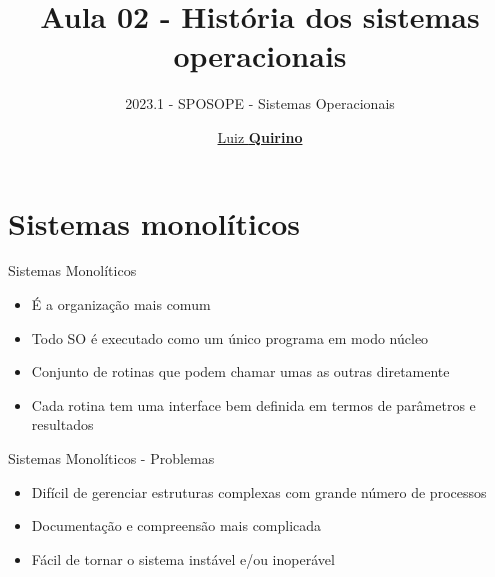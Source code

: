 \documentclass{beamer}
\title{Aula 02 - História dos sistemas operacionais}
\subtitle{2023.1 - SPOSOPE - Sistemas Operacionais}
\author{\href{mailto:luizfpq@gmail.com}{Luiz \textbf{Quirino}}}
\newcommand{\hrefcol}[2]{\textcolor{cyan}{\href{#1}{#2}}}
\begin{document}
\maketitle

%
%




\section{Sistemas monolíticos}

\begin{frame}{Sistemas Monolíticos}
    \begin{itemize}
        \item É a organização mais comum
        \item Todo SO é executado como um único programa em modo núcleo
        \item Conjunto de rotinas que podem chamar umas as outras diretamente
        \item Cada rotina tem uma interface bem definida em termos de parâmetros e resultados
    \end{itemize}
\end{frame}
\begin{frame}{Sistemas Monolíticos - Problemas}
    \begin{itemize}
        \item Difícil de gerenciar estruturas complexas com grande número de processos
        \item Documentação e compreensão mais complicada
        \item Fácil de tornar o sistema instável e/ou inoperável
    \end{itemize}
\end{frame}
\end{document}
